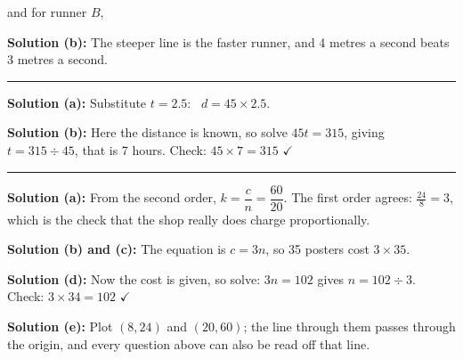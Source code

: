 \documentclass[12pt]{article}
\begin{document}
and for runner $B$, 

\textbf{Solution (b):} The steeper line is the faster runner, and 4 metres a second
beats 3 metres a second.

\vspace{0.2cm}\noindent\rule{\linewidth}{0.2pt}


\textbf{Solution (a):} Substitute $t = 2.5$: \ $d = 45 \times 2.5$.

\textbf{Solution (b):} Here the distance is known, so solve $45t = 315$, giving
$t = 315 \div 45$, that is 7 hours.
Check: $45 \times 7 = 315$ $\checkmark$

\vspace{0.2cm}\noindent\rule{\linewidth}{0.2pt}


\textbf{Solution (a):} From the second order, $k = \dfrac{c}{n} = \dfrac{60}{20}$.
The first order agrees: $\tfrac{24}{8} = 3$, which is the check that the shop really
does charge proportionally.

\textbf{Solution (b) and (c):} The equation is $c = 3n$, so 35 posters cost
$3 \times 35$.

\textbf{Solution (d):} Now the cost is given, so solve: $3n = 102$ gives
$n = 102 \div 3$.
Check: $3 \times 34 = 102$ $\checkmark$

\textbf{Solution (e):} Plot $(8, 24)$ and $(20, 60)$; the line through them passes
through the origin, and every question above can also be read off that line.
\end{document}
